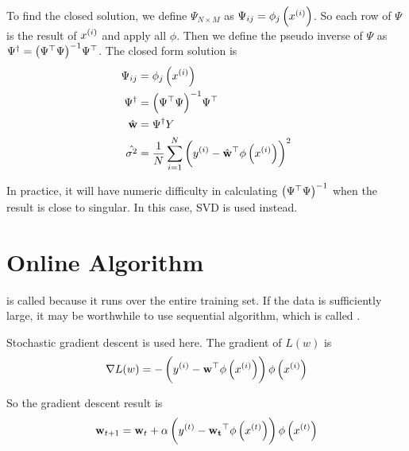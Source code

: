 To find the closed solution, we define $\Psi_{N \times M}$ as $\Psi_{ij} = \phi_j \left({x}^{(i)}\right)$. So each row of $\Psi$ is the result of ${x}^{(i)}$ and apply all $\phi$. Then we define the pseudo inverse of $\Psi$ as ${\Psi}^\dagger = {\left({\Psi}^\top \Psi\right)}^{-1} {\Psi}^\top$. The closed form solution is
\begin{equation}\label{closed_simple_linear_regression_solution}
    \begin{aligned}
        \Psi_{ij} &= \phi_j \left({x}^{(i)}\right) \\
        {\Psi}^\dagger &= {\left({\Psi}^\top \Psi\right)}^{-1} {\Psi}^\top \\
        \hat{\mathbf{w}} &= {\Psi}^\dagger Y \\
        \hat{\sigma^2} &= \frac{1}{N} \sum_{i=1}^N \left( {y}^{(i)} - {\hat{\mathbf{w}}}^\top \phi\left( {x}^{(i)} \right) \right)^2
    \end{aligned}
\end{equation}


In practice, it will have numeric difficulty in calculating ${\left({\Psi}^\top \Psi\right)}^{-1}$ when the result is close to singular. In this case, SVD is used instead.


\section{Online Algorithm}

 is called  because it runs over the entire training set. If the data is sufficiently large, it may be worthwhile to use sequential algorithm, which is called .

Stochastic gradient descent is used here. The gradient of $L(w)$ is
\begin{equation}
    \nabla L(w) = - \left( {y}^{(i)} - {\mathbf{w}}^\top \phi\left({x}^{(i)}\right) \right) \phi\left({x}^{(i)}\right)
\end{equation}

So the gradient descent result is
\begin{equation}
    \mathbf{w}_{t+1} = \mathbf{w}_t + \alpha \left( {y}^{(t)} - {\mathbf{w_t}}^\top \phi\left({x}^{(t)}\right) \right) \phi\left({x}^{(t)}\right)
\end{equation}


